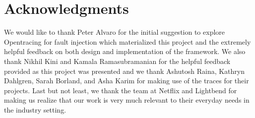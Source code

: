 \documentclass[letterpaper,twocolumn,10pt]{article}
\begin{document}










\section{Acknowledgments}
We would like to thank Peter Alvaro for the initial suggestion to explore Opentracing for fault injection which materialized this project and the extremely helpful feedback on both design and implementation of the framework. We also thank Nikhil Kini and Kamala Ramasubramanian for the helpful feedback provided as this project was presented and we thank Ashutosh Raina, Kathryn Dahlgren, Sarah Borland, and Asha Karim for making use of the traces for their projects. Last but not least, we thank the team at Netflix and Lightbend for making us realize that our work is very much relevant to their everyday needs in the industry setting.



\end{document}
